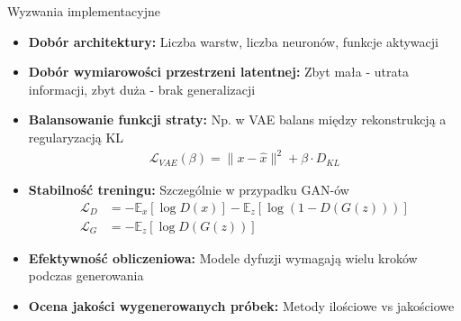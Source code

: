 \documentclass{beamer}
\begin{document}
\begin{frame}{Wyzwania implementacyjne}
  \begin{itemize}
    \item \textbf{Dobór architektury:} Liczba warstw, liczba neuronów, funkcje aktywacji
    \item \textbf{Dobór wymiarowości przestrzeni latentnej:} Zbyt mała - utrata informacji, zbyt duża - brak generalizacji
    \item \textbf{Balansowanie funkcji straty:} Np. w VAE balans między rekonstrukcją a regularyzacją KL
    \begin{align*}
    \mathcal{L}_{VAE}(\beta) = \|x - \hat{x}\|^2 + \beta \cdot D_{KL}
    \end{align*}
    \item \textbf{Stabilność treningu:} Szczególnie w przypadku GAN-ów
    \begin{align*}
    \mathcal{L}_D &= -\mathbb{E}_x[\log D(x)] - \mathbb{E}_z[\log(1 - D(G(z)))] \\
    \mathcal{L}_G &= -\mathbb{E}_z[\log D(G(z))]
    \end{align*}
    \item \textbf{Efektywność obliczeniowa:} Modele dyfuzji wymagają wielu kroków podczas generowania
    \item \textbf{Ocena jakości wygenerowanych próbek:} Metody ilościowe vs jakościowe
  \end{itemize}
\end{frame}
\end{document}
